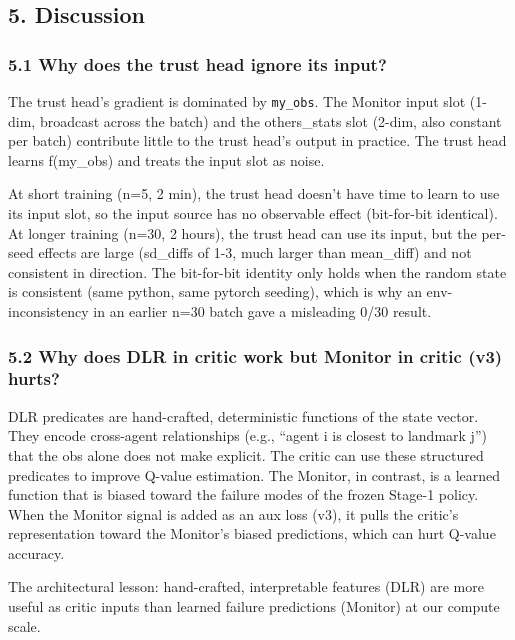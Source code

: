 \documentclass[
]{article}
\begin{document}
\subsection{5. Discussion}\label{discussion}

\subsubsection{5.1 Why does the trust head ignore its
input?}\label{why-does-the-trust-head-ignore-its-input}

The trust head's gradient is dominated by \texttt{my\_obs}. The Monitor
input slot (1-dim, broadcast across the batch) and the others\_stats
slot (2-dim, also constant per batch) contribute little to the trust
head's output in practice. The trust head learns f(my\_obs) and treats
the input slot as noise.

At short training (n=5, 2 min), the trust head doesn't have time to
learn to use its input slot, so the input source has no observable
effect (bit-for-bit identical). At longer training (n=30, 2 hours), the
trust head can use its input, but the per-seed effects are large
(sd\_diffs of 1-3, much larger than mean\_diff) and not consistent in
direction. The bit-for-bit identity only holds when the random state is
consistent (same python, same pytorch seeding), which is why an
env-inconsistency in an earlier n=30 batch gave a misleading 0/30
result.

\subsubsection{5.2 Why does DLR in critic work but Monitor in critic
(v3)
hurts?}\label{why-does-dlr-in-critic-work-but-monitor-in-critic-v3-hurts}

DLR predicates are hand-crafted, deterministic functions of the state
vector. They encode cross-agent relationships (e.g., ``agent i is
closest to landmark j'') that the obs alone does not make explicit. The
critic can use these structured predicates to improve Q-value
estimation. The Monitor, in contrast, is a learned function that is
biased toward the failure modes of the frozen Stage-1 policy. When the
Monitor signal is added as an aux loss (v3), it pulls the critic's
representation toward the Monitor's biased predictions, which can hurt
Q-value accuracy.

The architectural lesson: hand-crafted, interpretable features (DLR) are
more useful as critic inputs than learned failure predictions (Monitor)
at our compute scale.
\end{document}
